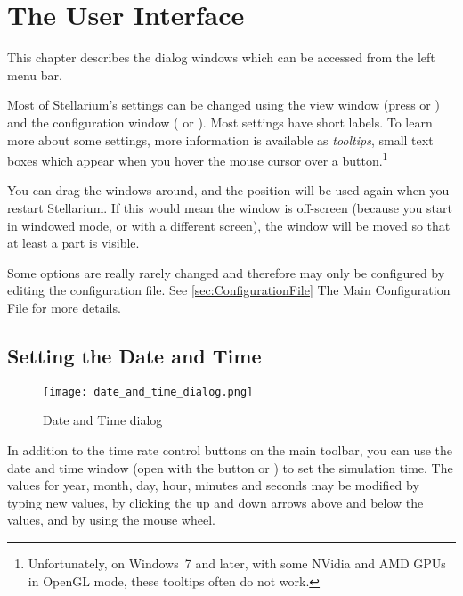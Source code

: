 

\chapter{The User Interface}
\label{ch:gui}


This chapter describes the dialog windows which can be accessed from the left menu bar.

Most of Stellarium's settings can be changed using the view window
(press  or ) and the
configuration window ( or
). Most settings have short labels. To learn more about some
settings, more information is available as \emph{tooltips}, small text
boxes which appear when you hover the mouse cursor over a
button.\footnote{Unfortunately, on Windows~7 and later, with some NVidia
  and AMD GPUs in OpenGL mode, these tooltips often do not work.}

 You can drag the
windows around, and the position will be used again when you restart
Stellarium. If this would mean the window is off-screen (because you
start in windowed mode, or with a different screen), the window will
be moved so that at least a part is visible.

Some options are really rarely changed and therefore may only be
configured by editing the configuration file.  See
\ref{sec:ConfigurationFile} The Main Configuration File for more
details.



\section{Setting the Date and Time}
\label{sec:gui:date}

\begin{figure}[h]
\centering\texttt{[image: date\_and\_time\_dialog.png]}
\caption{Date and Time dialog}
\label{fig:gui:date}
\end{figure}

In addition to the time rate control buttons on the main toolbar, you
can use the date and time window (open with the  
button or ) to set the simulation time. The values
for year, month, day, hour, minutes and seconds may be modified by
typing new values, by clicking the up and down arrows above and below
the values, and by using the mouse wheel.


